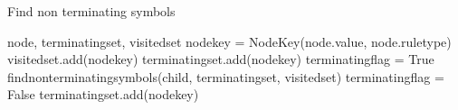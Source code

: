 \begin{algorithm}[H]
\caption{Find non terminating symbols}
\begin{algorithmic}[1] 
\Require node, terminating\textunderscore set, visited\textunderscore set
\State node\textunderscore key = Node\textunderscore Key(node.value, node.rule\textunderscore type)
	\State visited\textunderscore set.add(node\textunderscore key)
			\State terminating\textunderscore set.add(node\textunderscore key)
		\Else
			\State terminating\textunderscore flag = True
				\State find\textunderscore non\textunderscore terminating\textunderscore symbols(child, terminating\textunderscore set, visited\textunderscore set)		
					\State terminating\textunderscore flag = False
				\EndIf
			\EndFor
				\State terminating\textunderscore set.add(node\textunderscore key)
			\EndIf
		\EndIf
	\EndFor
\EndIf
\end{algorithmic}
\label{alg:find_non_terminating_symbols}
\end{algorithm}


